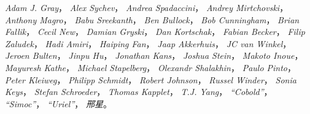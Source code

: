 \emph{Adam J. Gray}，
\emph{Alex Sychev}，
\emph{Andrea Spadaccini}，
\emph{Andrey Mirtchovski}，
\emph{Anthony Magro}，
\emph{Babu Sreekanth}，
\emph{Ben Bullock}，
\emph{Bob Cunningham}，
\emph{Brian Fallik}，
\emph{Cecil New}，
\emph{Damian Gryski}，
\emph{Dan Kortschak}，
\emph{Fabian Becker}，
\emph{Filip Zaludek}，
\emph{Hadi Amiri}，
\emph{Haiping Fan}，
\emph{Jaap Akkerhuis}，
\emph{JC van Winkel}，
\emph{Jeroen Bulten}，
\emph{Jinpu Hu}，
\emph{Jonathan Kans}，
\emph{Joshua Stein}，
\emph{Makoto Inoue}，
\emph{Mayuresh Kathe}，
\emph{Michael Stapelberg}，
\emph{Olexandr Shalakhin}，
\emph{Paulo Pinto}，
\emph{Peter Kleiweg}，
\emph{Philipp Schmidt}，
\emph{Robert Johnson}，
\emph{Russel Winder}，
\emph{Sonia Keys}，
\emph{Stefan Schroeder}，
\emph{Thomas Kapplet}，
\emph{T.J. Yang}，
\emph{``Cobold''}，
\emph{``Simoc''}，
\emph{``Uriel''}，
\emph{邢星}。

